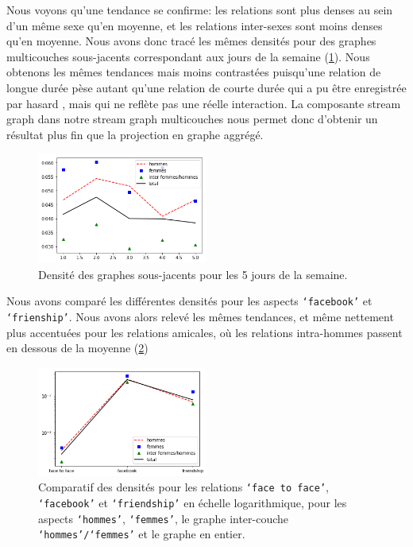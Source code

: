 \documentclass[11pt,a4paper]{article}
\theoremstyle{definition}
\theoremstyle{remark}
\theoremstyle{remark}
\def \stg {stream graph}
\def \stgm {stream graph multicouches}
\begin{document}
Nous voyons qu'une tendance se confirme: les relations sont plus denses au sein d'un même sexe qu'en moyenne, et les relations inter-sexes sont moins denses qu'en moyenne. Nous avons donc tracé les mêmes densités pour des graphes multicouches sous-jacents correspondant aux jours de la semaine (\cref{dsj}). Nous obtenons les mêmes tendances mais moins \og contrastées \fg{} puisqu'une relation de longue durée \og pèse \fg{} autant qu'une relation de courte durée qui a pu être enregistrée \og par hasard \fg{}, mais qui ne reflète pas une réelle interaction. La composante \stg{} dans notre \stgm{} nous permet donc d'obtenir un résultat plus \og fin \fg{} que la projection en graphe aggrégé.

\begin{figure}[H]
	\centering
	\includegraphics[width=0.5\textwidth]{densitesj.png}
	\caption{Densité des graphes sous-jacents pour les 5 jours de la semaine.}
	\label{dsj}
\end{figure}

Nous avons comparé les différentes densités pour les aspects \texttt{`facebook'} et \texttt{`frienship'}. Nous avons alors relevé les mêmes tendances, et même nettement plus accentuées pour les relations amicales, où les relations intra-hommes passent en dessous de la moyenne (\cref{comp})

\begin{figure}[H]
	\centering
	\includegraphics[width=0.5\textwidth]{comparatif.png}
	\caption{Comparatif des densités pour les relations \texttt{`face to face'}, \texttt{`facebook'} et \texttt{`friendship'} en échelle logarithmique, pour les aspects \texttt{`hommes'}, \texttt{`femmes'}, le graphe inter-couche \texttt{`hommes'/`femmes'} et le graphe en entier.}
	\label{comp}
\end{figure}  
\end{document}
